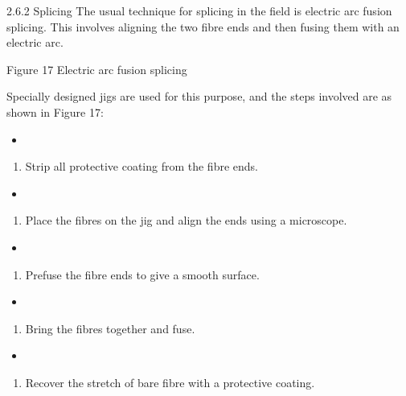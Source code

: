 \documentclass[letterpaper,10pt,english]{sphinxmanual}
\let\sphinxpxdimen\pdfpxdimen\else\newdimen\sphinxpxdimen
\begin{document}
2.6.2 Splicing The usual technique for splicing in the field is electric arc fusion splicing. This involves aligning the two fibre ends and then fusing them with an electric arc.

\sphinxincludegraphics[width=511\sphinxpxdimen,height=964\sphinxpxdimen]{{t305_017i}.jpg}

Figure 17 Electric arc fusion splicing

Specially designed jigs are used for this purpose, and the steps involved are as shown in Figure 17:
\begin{itemize}
\item {} 
\end{itemize}
\begin{enumerate}
%
\item {} 
Strip all protective coating from the fibre ends.

\end{enumerate}
\begin{itemize}
\item {} 
\end{itemize}
\begin{enumerate}
%
\setcounter{enumi}{1}
\item {} 
Place the fibres on the jig and align the ends using a microscope.

\end{enumerate}
\begin{itemize}
\item {} 
\end{itemize}
\begin{enumerate}
%
\setcounter{enumi}{2}
\item {} 
Pre\sphinxhyphen{}fuse the fibre ends to give a smooth surface.

\end{enumerate}
\begin{itemize}
\item {} 
\end{itemize}
\begin{enumerate}
%
\setcounter{enumi}{3}
\item {} 
Bring the fibres together and fuse.

\end{enumerate}
\begin{itemize}
\item {} 
\end{itemize}
\begin{enumerate}
%
\setcounter{enumi}{4}
\item {} 
Re\sphinxhyphen{}cover the stretch of bare fibre with a protective coating.

\end{enumerate}
\end{document}
